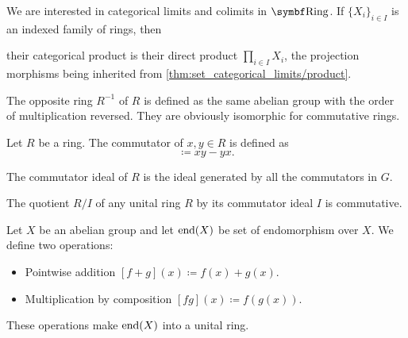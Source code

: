 \begin{proposition}\label{thm:ring_categorical_limits}
  We are interested in categorical limits and colimits in \( \Cat{Ring} \). If \( \{ X_i \}_{i \in I} \) is an indexed family of rings, then
  \begin{defenum}
     their categorical product is their direct product \( \prod_{i \in I} X_i \), the projection morphisms being inherited from \cref{thm:set_categorical_limits/product}.
  \end{defenum}
\end{proposition}

\begin{definition}\label{def:opposite_ring}\cite[555]{Knapp2016BAlg}
  The opposite ring \( R^{-1} \) of \( R \) is defined as the same abelian group with the order of multiplication reversed. They are obviously isomorphic for commutative rings.
\end{definition}

\begin{definition}\label{def:ring_commutator}
  Let \( R \) be a ring. The commutator of \( x, y \in R \) is defined as
  \begin{equation*}
    [x, y] \coloneqq xy - yx.
  \end{equation*}

  The commutator ideal of \( R \) is the ideal generated by all the commutators in \( G \).
\end{definition}

\begin{proposition}\label{thm:quotient_by_commutator_ideal}
  The quotient \( R / I \) of any unital ring \( R \) by its commutator ideal \( I \) is commutative.
\end{proposition}

\begin{definition}\label{def:endomorphism_ring}
  Let \( X \) be an abelian group and let \( \operatorname{end}(X) \) be set of endomorphism over \( X \). We define two operations:
  \begin{itemize}
    \item Pointwise addition \( [f + g](x) \coloneqq f(x) + g(x) \).
    \item Multiplication by composition \( [fg](x) \coloneqq f(g(x)) \).
  \end{itemize}

  These operations make \( \operatorname{end}(X) \) into a unital ring.
\end{definition}

